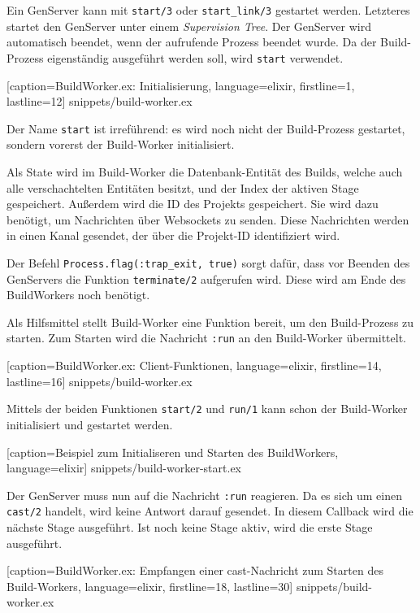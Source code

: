 Ein GenServer kann mit \texttt{start/3} oder \texttt{start\_link/3} gestartet werden. Letzteres startet den GenServer unter einem \emph{Supervision Tree}. Der GenServer wird automatisch beendet, wenn der aufrufende Prozess beendet wurde. Da der Build-Prozess eigenständig ausgeführt werden soll, wird \texttt{start} verwendet.


  [caption={BuildWorker.ex: Initialisierung},
  language=elixir,
  firstline=1,
  lastline=12]
  {snippets/build-worker.ex}

Der Name \texttt{start} ist irreführend: es wird noch nicht der Build-Prozess gestartet, sondern vorerst der Build-Worker initialisiert.

Als State wird im Build-Worker die Datenbank-Entität des Builds, welche auch alle verschachtelten Entitäten besitzt, und der Index der aktiven Stage gespeichert. Außerdem wird die ID des Projekts gespeichert. Sie wird dazu benötigt, um Nachrichten über Websockets zu senden. Diese Nachrichten werden in einen Kanal gesendet, der über die Projekt-ID identifiziert wird.

Der Befehl \texttt{Process.flag(:trap\_exit,\allowbreak\ true)} sorgt dafür, dass vor Beenden des GenServers die Funktion \texttt{terminate/2} aufgerufen wird. Diese wird am Ende des BuildWorkers noch benötigt.

Als Hilfsmittel stellt Build-Worker eine Funktion bereit, um den Build-Prozess zu starten. Zum Starten wird die Nachricht \texttt{:run} an den Build-Worker übermittelt.


  [caption={BuildWorker.ex: Client-Funktionen},
  language=elixir,
  firstline=14,
  lastline=16]
  {snippets/build-worker.ex}

Mittels der beiden Funktionen \texttt{start/2} und \texttt{run/1} kann schon der Build-Worker initialisiert und gestartet werden.


  [caption={Beispiel zum Initialiseren und Starten des BuildWorkers},
  language=elixir]
  {snippets/build-worker-start.ex}

Der GenServer muss nun auf die Nachricht \texttt{:run} reagieren. Da es sich um einen \texttt{cast/2} handelt, wird keine Antwort darauf gesendet. In diesem Callback wird die nächste Stage ausgeführt. Ist noch keine Stage aktiv, wird die erste Stage ausgeführt.


  [caption={BuildWorker.ex: Empfangen einer cast-Nachricht zum Starten des Build-Workers},
  language=elixir,
  firstline=18,
  lastline=30]
  {snippets/build-worker.ex}

